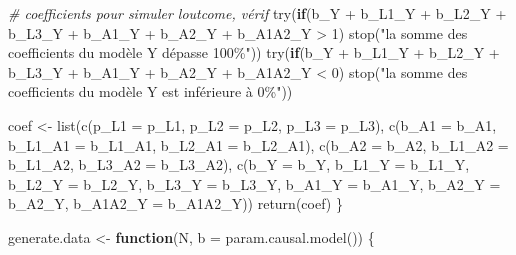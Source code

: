 \documentclass[
]{book}
\newenvironment{Shaded}{\begin{snugshade}}{\end{snugshade}}
\newcommand{\AttributeTok}[1]{\textcolor[rgb]{0.77,0.63,0.00}{#1}}
\newcommand{\CommentTok}[1]{\textcolor[rgb]{0.56,0.35,0.01}{\textit{#1}}}
\newcommand{\ControlFlowTok}[1]{\textcolor[rgb]{0.13,0.29,0.53}{\textbf{#1}}}
\newcommand{\DecValTok}[1]{\textcolor[rgb]{0.00,0.00,0.81}{#1}}
\newcommand{\FunctionTok}[1]{\textcolor[rgb]{0.00,0.00,0.00}{#1}}
\newcommand{\NormalTok}[1]{#1}
\newcommand{\OtherTok}[1]{\textcolor[rgb]{0.56,0.35,0.01}{#1}}
\newcommand{\SpecialCharTok}[1]{\textcolor[rgb]{0.00,0.00,0.00}{#1}}
\newcommand{\StringTok}[1]{\textcolor[rgb]{0.31,0.60,0.02}{#1}}
\begin{document}
\begin{Shaded}
\begin{Highlighting}[]
  \CommentTok{\# coefficients pour simuler l\textquotesingle{}outcome, vérif}
  \FunctionTok{try}\NormalTok{(}\ControlFlowTok{if}\NormalTok{(b\_Y }\SpecialCharTok{+}\NormalTok{ b\_L1\_Y }\SpecialCharTok{+}\NormalTok{ b\_L2\_Y }\SpecialCharTok{+}\NormalTok{ b\_L3\_Y }\SpecialCharTok{+}\NormalTok{ b\_A1\_Y }\SpecialCharTok{+}\NormalTok{ b\_A2\_Y }\SpecialCharTok{+}\NormalTok{ b\_A1A2\_Y }\SpecialCharTok{\textgreater{}} \DecValTok{1}\NormalTok{) }
    \FunctionTok{stop}\NormalTok{(}\StringTok{"la somme des coefficients du modèle Y dépasse 100\%"}\NormalTok{))}
  \FunctionTok{try}\NormalTok{(}\ControlFlowTok{if}\NormalTok{(b\_Y }\SpecialCharTok{+}\NormalTok{ b\_L1\_Y }\SpecialCharTok{+}\NormalTok{ b\_L2\_Y }\SpecialCharTok{+}\NormalTok{ b\_L3\_Y }\SpecialCharTok{+}\NormalTok{ b\_A1\_Y }\SpecialCharTok{+}\NormalTok{ b\_A2\_Y }\SpecialCharTok{+}\NormalTok{ b\_A1A2\_Y }\SpecialCharTok{\textless{}} \DecValTok{0}\NormalTok{) }
    \FunctionTok{stop}\NormalTok{(}\StringTok{"la somme des coefficients du modèle Y est inférieure à 0\%"}\NormalTok{))}
  
\NormalTok{  coef }\OtherTok{\textless{}{-}} \FunctionTok{list}\NormalTok{(}\FunctionTok{c}\NormalTok{(}\AttributeTok{p\_L1 =}\NormalTok{ p\_L1, }\AttributeTok{p\_L2 =}\NormalTok{ p\_L2, }\AttributeTok{p\_L3 =}\NormalTok{ p\_L3),}
               \FunctionTok{c}\NormalTok{(}\AttributeTok{b\_A1 =}\NormalTok{ b\_A1, }\AttributeTok{b\_L1\_A1 =}\NormalTok{ b\_L1\_A1, }\AttributeTok{b\_L2\_A1 =}\NormalTok{ b\_L2\_A1),}
               \FunctionTok{c}\NormalTok{(}\AttributeTok{b\_A2 =}\NormalTok{ b\_A2, }\AttributeTok{b\_L1\_A2 =}\NormalTok{ b\_L1\_A2, }\AttributeTok{b\_L3\_A2 =}\NormalTok{ b\_L3\_A2),}
               \FunctionTok{c}\NormalTok{(}\AttributeTok{b\_Y =}\NormalTok{ b\_Y, }\AttributeTok{b\_L1\_Y =}\NormalTok{ b\_L1\_Y, }\AttributeTok{b\_L2\_Y =}\NormalTok{ b\_L2\_Y, }\AttributeTok{b\_L3\_Y =}\NormalTok{ b\_L3\_Y,}
                 \AttributeTok{b\_A1\_Y =}\NormalTok{ b\_A1\_Y, }\AttributeTok{b\_A2\_Y =}\NormalTok{ b\_A2\_Y, }\AttributeTok{b\_A1A2\_Y =}\NormalTok{ b\_A1A2\_Y))}
  \FunctionTok{return}\NormalTok{(coef)}
\NormalTok{\}}

\NormalTok{generate.data }\OtherTok{\textless{}{-}} \ControlFlowTok{function}\NormalTok{(N, }\AttributeTok{b =}  \FunctionTok{param.causal.model}\NormalTok{()) \{}
  

\end{Highlighting}
\end{Shaded}
\end{document}
